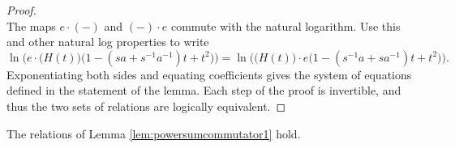\begin{proof}
\begin{equation}
\end{equation}
The maps $e \cdot (-)$ and $(-) \cdot e$ commute with the natural logarithm. Use this and other natural log properties to write
\begin{equation}
\ln\Big( e \cdot \big( H(t) \big) \big( 1 - (sa + s^{-1}a^{-1})t + t^2 \big) \Big) = \ln\Big( \big( H(t) \big) \cdot e \big( 1 - (s^{-1}a + sa^{-1})t + t^2 \big) \Big).
\end{equation}
Exponentiating both sides and equating coefficients gives the system of equations defined in the statement of the lemma. Each step of the proof is invertible, and thus the two sets of relations are logically equivalent.
\end{proof}

\begin{lemma}
The relations of Lemma \ref{lem:powersumcommutator1} hold.
\end{lemma}
